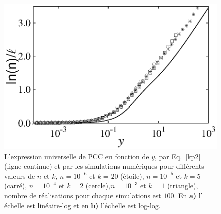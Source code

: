 \begin{figure}[h!]
	\centering
	\includegraphics[scale=1,angle=0]{./figures/fig4-4}
	\caption{L'expression universelle de PCC en fonction de $y$, par Eq.~\eqref{kp2} (ligne continue) et par les simulations numériques pour différents valeurs de $n$ et $k$, $n=10^{-6}$ et $k=20$ (étoile), $n=10^{-5}$ et $k=5$ (carré), $n=10^{-4}$ et $k=2$ (cercle),$n=10^{-3}$ et $k=1$ (triangle), nombre de réalisations pour chaque simulations est $100$. En \textbf{a)} l' échelle est linéaire-log et en \textbf{b)} l'échelle est log-log.}
	\label{fu}
\end{figure}

